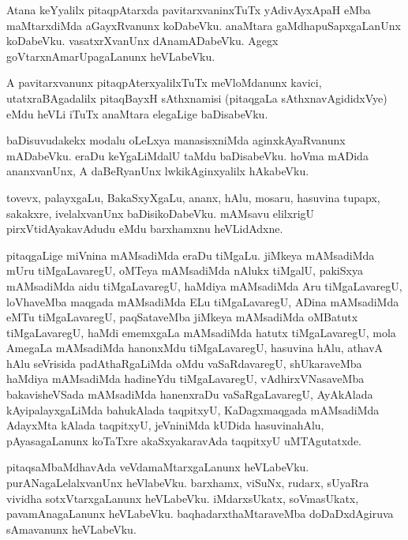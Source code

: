 \documentclass{article}
\begin{document}
\begin{mn}
Atana keYyalilx pitaqpAtarxda pavitarxvaninxTuTx yAdivAyxApaH eMba
maMtarxdiMda aGayxRvanunx koDabeVku. anaMtara gaMdhapuSapxgaLanUnx
koDabeVku. vasatxrXvanUnx dAnamADabeVku. Agegx goVtarxnAmarUpagaLanunx heVLabeVku.
\end{mn}

\begin{mn}
A pavitarxvanunx pitaqpAterxyalilxTuTx meVloMdanunx kavici,
utatxraBAgadalilx pitaqBayxH sAthxnamisi (pitaqgaLa
sAthxnavAgididxVye) eMdu heVLi iTuTx anaMtara elegaLige baDisabeVku.
\end{mn}

\begin{mn}%
baDisuvudakekx modalu oLeLxya manasisxniMda aginxkAyaRvanunx
mADabeVku. eraDu keYgaLiMdalU taMdu baDisabeVku. hoVma mADida
ananxvanUnx, A daBeRyanUnx lwkikAginxyalilx hAkabeVku.
\end{mn}

\begin{mn}
tovevx, palayxgaLu, BakaSxyXgaLu, ananx, hAlu, mosaru, hasuvina
tupapx, sakakxre, ivelalxvanUnx baDisikoDabeVku. mAMsavu elilxrigU
pirxVtidAyakavAdudu eMdu barxhamxnu heVLidAdxne.
\end{mn}

\begin{mn}%
pitaqgaLige miVnina mAMsadiMda eraDu tiMgaLu. jiMkeya mAMsadiMda mUru
tiMgaLavaregU, oMTeya mAMsadiMda nAlukx tiMgalU, pakiSxya mAMsadiMda
aidu tiMgaLavaregU, haMdiya mAMsadiMda Aru tiMgaLavaregU, loVhaveMba
maqgada mAMsadiMda ELu tiMgaLavaregU, ADina mAMsadiMda eMTu
tiMgaLavaregU, paqSataveMba jiMkeya mAMsadiMda oMBatutx tiMgaLavaregU,
haMdi ememxgaLa mAMsadiMda hatutx tiMgaLavaregU, mola AmegaLa
mAMsadiMda hanonxMdu tiMgaLavaregU, hasuvina hAlu, athavA hAlu
seVrisida padAthaRgaLiMda oMdu vaSaRdavaregU, shUkaraveMba haMdiya
mAMsadiMda hadineYdu tiMgaLavaregU, vAdhirxVNasaveMba bakavisheVSada
mAMsadiMda hanenxraDu vaSaRgaLavaregU, AyAkAlada kAyipalayxgaLiMda
bahukAlada taqpitxyU, KaDagxmaqgada mAMsadiMda AdayxMta kAlada
taqpitxyU, jeVniniMda kUDida hasuvinahAlu, pAyasagaLanunx koTaTxre
akaSxyakaravAda taqpitxyU uMTAgutatxde.
\end{mn}

\begin{mn}%
pitaqsaMbaMdhavAda veVdamaMtarxgaLanunx
heVLabeVku. purANagaLelalxvanUnx heVlabeVku. barxhamx, viSuNx, rudarx,
sUyaRra vividha sotxVtarxgaLanunx heVLabeVku. iMdarxsUkatx,
soVmasUkatx, pavamAnagaLanunx heVLabeVku. baqhadarxthaMtaraveMba
doDaDxdAgiruva sAmavanunx heVLabeVku.
\end{mn}
\end{document}
